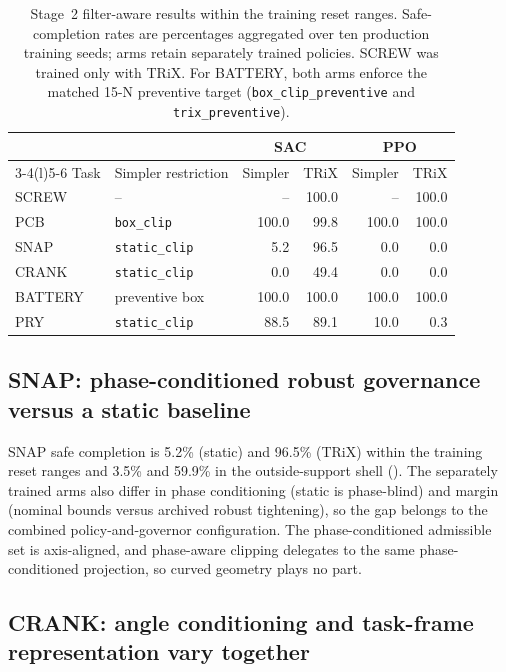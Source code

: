 \documentclass[10pt]{article}
\let\suppsection\suppname
\begin{document}
\begin{table}[htbp]
\centering
\caption{Stage~2 filter-aware results within the training reset ranges.
Safe-completion rates are percentages aggregated over ten production training
seeds; arms retain separately trained policies. SCREW was trained only with
TRiX. For BATTERY, both arms enforce the matched 15-N preventive target
(\texttt{box\_clip\_preventive} and \texttt{trix\_preventive}).}
\label{tab:stage2-key}
\begin{tabular}{llrrrr}
\toprule
& & \multicolumn{2}{c}{SAC} & \multicolumn{2}{c}{PPO}\\
\cmidrule(lr){3-4}\cmidrule(l){5-6}
Task & Simpler restriction & Simpler & TRiX & Simpler & TRiX\\
\midrule
SCREW & -- & -- & 100.0 & -- & 100.0\\
PCB   & \texttt{box\_clip} & 100.0 & 99.8 & 100.0 & 100.0\\
SNAP  & \texttt{static\_clip} & 5.2  & 96.5 & 0.0 & 0.0\\
CRANK & \texttt{static\_clip} & 0.0  & 49.4 & 0.0 & 0.0\\
BATTERY & preventive box & 100.0 & 100.0 & 100.0 & 100.0\\
PRY   & \texttt{static\_clip} & 88.5 & 89.1 & 10.0 & 0.3\\
\bottomrule
\end{tabular}
\end{table}
\subsection{SNAP: phase-conditioned robust governance versus a static baseline}

SNAP safe completion is 5.2\% (static) and 96.5\% (TRiX) within the training
reset ranges and 3.5\% and 59.9\% in the outside-support shell
(\suppsection{S14}). The separately trained arms also differ in phase
conditioning (static is phase-blind) and margin (nominal bounds versus
archived robust tightening), so the gap belongs to the combined
policy-and-governor configuration. The phase-conditioned admissible set is
axis-aligned, and phase-aware clipping delegates to the same
phase-conditioned projection, so curved geometry plays no part.


\subsection{CRANK: angle conditioning and task-frame representation vary together}
\end{document}
